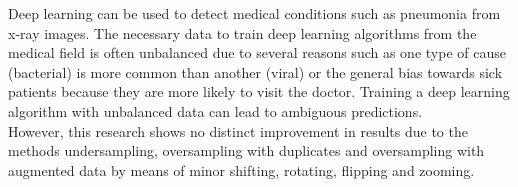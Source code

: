 Deep learning can be used to detect medical conditions such as pneumonia from x-ray images. The necessary data to train deep learning algorithms from the medical field is often unbalanced due to several reasons such as one type of cause (bacterial) is more common than another (viral) or the general bias towards sick patients because they are more likely to visit the doctor. Training a deep learning algorithm with unbalanced data can lead to ambiguous predictions. \\
However, this research shows no distinct improvement in results due to the methods undersampling, oversampling with duplicates and oversampling with augmented data by means of minor shifting, rotating, flipping and zooming.